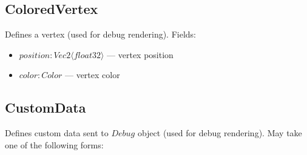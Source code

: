 \subsection{ColoredVertex}
Defines a vertex (used for debug rendering). Fields:
\begin{itemize}
    \item $position : Vec2 \langle float32 \rangle$ --- vertex position
    \item $color : Color$ --- vertex color
\end{itemize}

\subsection{CustomData}
Defines custom data sent to $Debug$ object (used for debug rendering).
May take one of the following forms:

